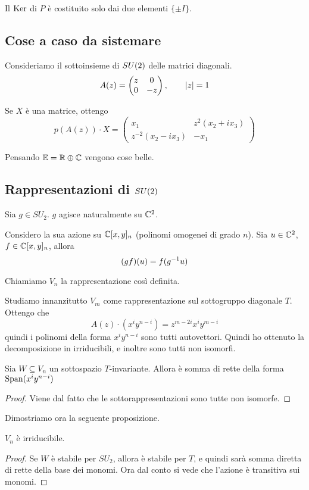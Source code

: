 			\begin{myprop}
				Il $\operatorname{Ker}$ di $P$ è costituito solo dai due elementi $\{\pm I\}$.
			\end{myprop}

		\subsection{Cose a caso da sistemare}

		Consideriamo il sottoinsieme di $SU(2)$ delle matrici diagonali.
		\[
			A(z) = \left(
				\begin{matrix}
				z & 0 \\
				0 & -z
				\end{matrix}
			\right), \qquad \left|z\right|=1
		\]

		Se $X$ è una matrice, ottengo
		\[
			p(A(z))\cdot X = \left( 
			\begin{matrix}
				x_1 & z^2(x_2+ix_3) \\
				z^{-2}(x_2-ix_3) & -x_1
			\end{matrix}
			\right)
		\]

		Pensando $\mathbb E = \mathbb R \oplus \mathbb C$ vengono cose belle.

\subsection{Rappresentazioni di $SU(2)$}
	Sia $g \in SU_2$. $g$ agisce naturalmente su $\mathbb C^2$.
	
	Considero la sua azione su $\mathbb C[x,y]_n$ (polinomi omogenei di grado $n$). Sia $u \in \mathbb C^2$, $f \in \mathbb C[x,y]_n$, allora 
	\[
	 (gf)(u) = f(g^{-1} u)
	\]
	
	Chiamiamo $V_n$ la rappresentazione così definita.

	Studiamo innanzitutto $V_m$ come rappresentazione sul sottogruppo diagonale $T$.
	Ottengo che 
	\[
		A(z) \cdot (x^i y^{n-i}) = z^{m-2i}x^iy^{m-i}
	\]
	quindi i polinomi della forma $x^iy^{n-i}$ sono tutti autovettori. Quindi ho ottenuto la decomposizione in irriducibili, e inoltre sono tutti non isomorfi.
	
	\begin{mylemma}
	 Sia $W\subseteq V_n$ un sottospazio $T$-invariante. Allora è somma di rette della forma $\operatorname{Span}(x^iy^{n-i})$
	\end{mylemma}
	\begin{proof}
		Viene dal fatto che le sottorappresentazioni sono tutte non isomorfe.
	\end{proof}

	Dimostriamo ora la seguente proposizione.
	\begin{myprop}
	 $V_n$ è irriducibile.
	\end{myprop}
	\begin{proof}
	 Se $W$ è stabile per $SU_2$, allora è stabile per $T$, e quindi sarà somma diretta di rette della base dei monomi. Ora dal conto si vede che l'azione è transitiva sui monomi. 
	\end{proof}


	



